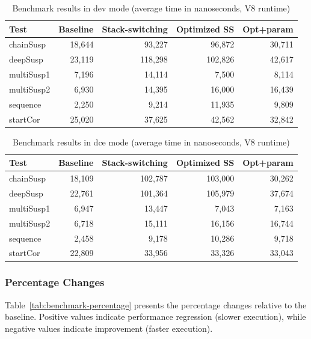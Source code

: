 \begin{table}[H]
\centering
\caption{Benchmark results in dev mode (average time in nanoseconds, V8 runtime)}
\label{tab:benchmark-dev}
\begin{tabular}{|l|r|r|r|r|}
\hline
\textbf{Test} & \textbf{Baseline} & \textbf{Stack-switching} & \textbf{Optimized SS} & \textbf{Opt+param} \\
\hline
chainSusp & 18{,}644 & 93{,}227 & 96{,}872 & 30{,}711 \\
deepSusp & 23{,}119 & 118{,}298 & 102{,}826 & 42{,}617 \\
multiSusp1 & 7{,}196 & 14{,}114 & 7{,}500 & 8{,}114 \\
multiSusp2 & 6{,}930 & 14{,}395 & 16{,}000 & 16{,}439 \\
sequence & 2{,}250 & 9{,}214 & 11{,}935 & 9{,}809 \\
startCor & 25{,}020 & 37{,}625 & 42{,}562 & 32{,}842 \\
\hline
\end{tabular}
\end{table}

\begin{table}[H]
\centering
\caption{Benchmark results in dce mode (average time in nanoseconds, V8 runtime)}
\label{tab:benchmark-dce}
\begin{tabular}{|l|r|r|r|r|}
\hline
\textbf{Test} & \textbf{Baseline} & \textbf{Stack-switching} & \textbf{Optimized SS} & \textbf{Opt+param} \\
\hline
chainSusp & 18{,}109 & 102{,}787 & 103{,}000 & 30{,}262 \\
deepSusp & 22{,}761 & 101{,}364 & 105{,}979 & 37{,}674 \\
multiSusp1 & 6{,}947 & 13{,}447 & 7{,}043 & 7{,}163 \\
multiSusp2 & 6{,}718 & 15{,}111 & 16{,}156 & 16{,}744 \\
sequence & 2{,}458 & 9{,}178 & 10{,}286 & 9{,}718 \\
startCor & 22{,}809 & 33{,}956 & 33{,}326 & 33{,}043 \\
\hline
\end{tabular}
\end{table}

\subsubsection*{Percentage Changes}

Table~\ref{tab:benchmark-percentage} presents the percentage changes relative to the baseline. Positive values indicate
performance regression (slower execution), while negative values indicate improvement (faster execution).

